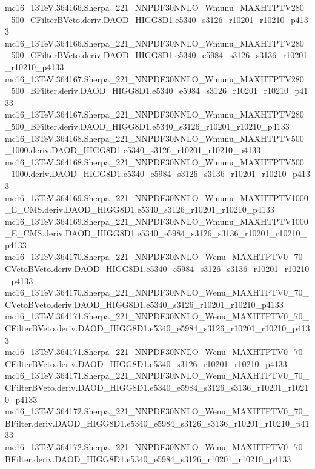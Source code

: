 \begin{scriptsize}
mc16\_13TeV.364166.Sherpa\_221\_NNPDF30NNLO\_Wmunu\_MAXHTPTV280\_500\_CFilterBVeto.deriv.DAOD\_HIGG8D1.e5340\_s3126\_r10201\_r10210\_p4133 \\
mc16\_13TeV.364166.Sherpa\_221\_NNPDF30NNLO\_Wmunu\_MAXHTPTV280\_500\_CFilterBVeto.deriv.DAOD\_HIGG8D1.e5340\_e5984\_s3126\_s3136\_r10201\_r10210\_p4133 \\
mc16\_13TeV.364167.Sherpa\_221\_NNPDF30NNLO\_Wmunu\_MAXHTPTV280\_500\_BFilter.deriv.DAOD\_HIGG8D1.e5340\_e5984\_s3126\_r10201\_r10210\_p4133 \\
mc16\_13TeV.364167.Sherpa\_221\_NNPDF30NNLO\_Wmunu\_MAXHTPTV280\_500\_BFilter.deriv.DAOD\_HIGG8D1.e5340\_s3126\_r10201\_r10210\_p4133 \\
mc16\_13TeV.364168.Sherpa\_221\_NNPDF30NNLO\_Wmunu\_MAXHTPTV500\_1000.deriv.DAOD\_HIGG8D1.e5340\_s3126\_r10201\_r10210\_p4133 \\
mc16\_13TeV.364168.Sherpa\_221\_NNPDF30NNLO\_Wmunu\_MAXHTPTV500\_1000.deriv.DAOD\_HIGG8D1.e5340\_e5984\_s3126\_s3136\_r10201\_r10210\_p4133 \\
mc16\_13TeV.364169.Sherpa\_221\_NNPDF30NNLO\_Wmunu\_MAXHTPTV1000\_E\_CMS.deriv.DAOD\_HIGG8D1.e5340\_s3126\_r10201\_r10210\_p4133 \\
mc16\_13TeV.364169.Sherpa\_221\_NNPDF30NNLO\_Wmunu\_MAXHTPTV1000\_E\_CMS.deriv.DAOD\_HIGG8D1.e5340\_e5984\_s3126\_s3136\_r10201\_r10210\_p4133 \\
mc16\_13TeV.364170.Sherpa\_221\_NNPDF30NNLO\_Wenu\_MAXHTPTV0\_70\_CVetoBVeto.deriv.DAOD\_HIGG8D1.e5340\_e5984\_s3126\_s3136\_r10201\_r10210\_p4133 \\
mc16\_13TeV.364170.Sherpa\_221\_NNPDF30NNLO\_Wenu\_MAXHTPTV0\_70\_CVetoBVeto.deriv.DAOD\_HIGG8D1.e5340\_s3126\_r10201\_r10210\_p4133 \\
mc16\_13TeV.364171.Sherpa\_221\_NNPDF30NNLO\_Wenu\_MAXHTPTV0\_70\_CFilterBVeto.deriv.DAOD\_HIGG8D1.e5340\_e5984\_s3126\_r10201\_r10210\_p4133 \\
mc16\_13TeV.364171.Sherpa\_221\_NNPDF30NNLO\_Wenu\_MAXHTPTV0\_70\_CFilterBVeto.deriv.DAOD\_HIGG8D1.e5340\_s3126\_r10201\_r10210\_p4133 \\
mc16\_13TeV.364171.Sherpa\_221\_NNPDF30NNLO\_Wenu\_MAXHTPTV0\_70\_CFilterBVeto.deriv.DAOD\_HIGG8D1.e5340\_e5984\_s3126\_s3136\_r10201\_r10210\_p4133 \\
mc16\_13TeV.364172.Sherpa\_221\_NNPDF30NNLO\_Wenu\_MAXHTPTV0\_70\_BFilter.deriv.DAOD\_HIGG8D1.e5340\_e5984\_s3126\_s3136\_r10201\_r10210\_p4133 \\
mc16\_13TeV.364172.Sherpa\_221\_NNPDF30NNLO\_Wenu\_MAXHTPTV0\_70\_BFilter.deriv.DAOD\_HIGG8D1.e5340\_e5984\_s3126\_r10201\_r10210\_p4133 \\

\end{scriptsize}
